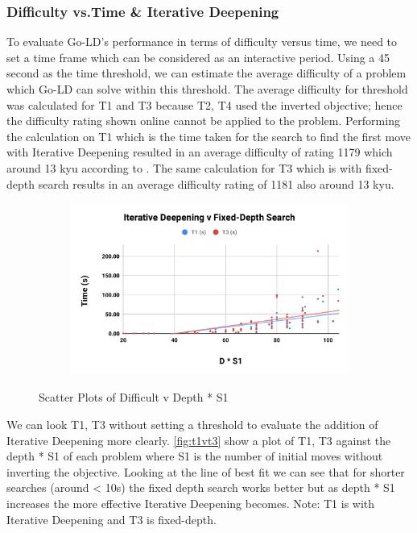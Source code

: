 \documentclass{l4proj}
\begin{document}
\subsubsection{Difficulty vs.Time \& Iterative Deepening}
To evaluate Go-LD's performance in terms of difficulty versus time, we need to set a time frame which can be considered as an interactive period. Using a 45 second as the time threshold, we can estimate the average difficulty of a problem which Go-LD can solve within this threshold. The average difficulty for threshold was calculated for T1 and T3 because T2, T4 used the inverted objective; hence the difficulty rating shown online cannot be applied to the problem. Performing the calculation on T1 which is the time taken for the search to find the first move with Iterative Deepening resulted in an average difficulty of rating 1179 which around 13 kyu according to \cite{GoProblems}. The same calculation for T3 which is with fixed-depth search results in an average difficulty rating of 1181 also around 13 kyu.

\begin{figure}[!h]
\centering
\begin{subfigure}[b]{\textwidth}
\centering
\includegraphics[width=\textwidth]{edvd/t1vt3.pdf}
\end{subfigure}
\caption{Scatter Plots of Difficult v Depth * S1}
\label{fig:t1vt3}
\end{figure}




We can look T1, T3 without setting a threshold to evaluate the addition of Iterative Deepening more clearly. \autoref{fig:t1vt3} show a plot of T1, T3 against the depth * S1 of each problem where S1 is the number of initial moves without inverting the objective. Looking at the line of best fit we can see that for shorter searches (around < 10s) the fixed depth search works better but as depth * S1 increases the more effective Iterative Deepening becomes. Note: T1 is with Iterative Deepening and T3 is fixed-depth.
\end{document}
